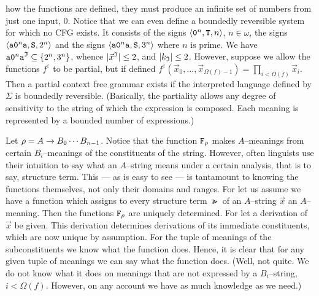 how the functions are defined, they must produce an infinite 
set of numbers from just one input, 0. Notice that we can even 
define a boundedly reversible system for which no CFG exists.
It consists of the signs $\langle \mbox{\tt 0}^n, \mbox{\tt T}, n\rangle$, 
$n \in \omega$, the signs $\langle \mbox{\tt a0$^n$a}, \mbox{\tt S}, 2^n\rangle$ 
and the signs $\langle \mbox{\tt a0$^n$a}, \mbox{\tt S}, 3^n\rangle$ 
where $n$ is prime. We have $\mbox{\tt a0$^n$a}^{\mathfrak{I}} \subseteq 
\{2^n, 3^n\}$, whence $|\vec{x}^{\mathfrak{I}}| \leq 2$, and $|k_{\mathfrak{I}}| \leq 2$.
However, suppose we allow the functions $f^{\varepsilon}$ 
to be partial, but if defined $f^{\varepsilon}(\vec{x}_0, 
\dotsc, \vec{x}_{\Omega(f)-1}) = \prod_{i < \Omega(f)} \vec{x}_i$.
Then a partial context free grammar exists if the interpreted 
language defined by $\Sigma$ is boundedly reversible. (Basically, 
the partiality allows any degree of sensitivity to the string of 
which the expression is composed. Each meaning is represented by 
a bounded number of expressions.)

Let $\rho = A \rightarrow B_0 \dotsb B_{n-1}$. Notice that  the function
$\mbox{\tt F}_{\rho}$ makes $A$--meanings from certain
$B_i$--meanings of the constituents of the string. However,
often linguists use their intuition to say what an $A$--string
means under a certain analysis, that is to say, structure term.
This --- as is easy to see --- is tantamount to knowing the
functions themselves, not only their domains and ranges. For
let us assume we have a function which assigns to every structure
term $\Gt$ of an $A$--string $\vec{x}$ an $A$--meaning. Then
the functions $\mbox{\tt F}_{\rho}$ are uniquely determined.
For let a derivation of $\vec{x}$ be given. This derivation
determines derivations of its immediate constituents, which
are now unique by assumption. For the tuple of meanings of
the subconstituents we know what the function does. Hence,
it is clear that for any given tuple of meanings we can
say what the function does. (Well, not quite. We do not know
what it does on meanings that are not expressed by a $B_i$--string,
$i < \Omega(f)$. However, on any account we have as much knowledge
as we need.)


